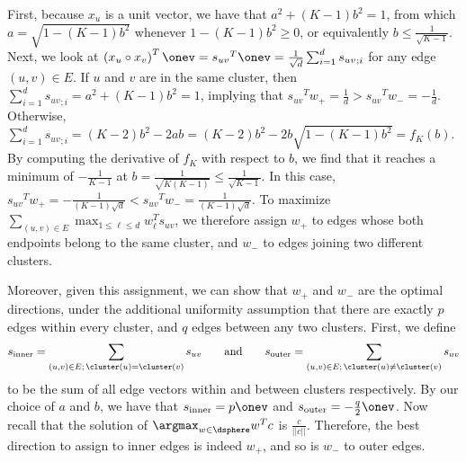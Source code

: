 First, because $x_u$ is a unit vector, we have that $a^2 + (K-1)b^2=1$, from which $a =
\sqrt{1-(K-1)b^2}$ whenever $1-(K-1)b^2 \geq 0$, or equivalently $b \leq \frac{1}{\sqrt{K-1}}$.
Next, we look at $\left(x_u \circ x_v\right)^T \onev = {s_{uv}}^T \onev = \frac{1}{\sqrt{d}}
\sum_{i=1}^d  {s_{uv}}_{;i}$ for any edge $(u,v) \in E$. If $u$ and $v$ are in the same cluster, then
$\sum_{i=1}^d  {s_{uv}}_{;i} = a^2 + (K-1)b^2 = 1$, implying that ${s_{uv}}^T w_+ = \frac{1}{d} >
{s_{uv}}^T w_- = -\frac{1}{d}$. Otherwise, $\sum_{i=1}^d  {s_{uv}}_{;i} = (K-2)b^2 - 2ab = (K-2)b^2 -
2b\sqrt{1-(K-1)b^2} = f_K(b)$. By computing the derivative of $f_K$ with respect to $b$, we find
that it reaches a minimum of $-\frac{1}{K-1}$ at $b = \frac{1}{\sqrt{K(K-1)}} \leq
\frac{1}{\sqrt{K-1}}$. In this case, ${s_{uv}}^T w_+ = -\frac{1}{(K-1) \sqrt{d}} < {s_{uv}}^T w_- =
\frac{1}{(K-1) \sqrt{d}}$. To maximize $\sum_{(u,v)\in E} \max_{1 \leq \ell \leq d} w_\ell^T
s_{uv}$, we therefore assign $w_+$ to edges whose both endpoints belong to the same cluster, and
$w_-$ to edges joining two different clusters.

Moreover, given this assignment, we can show that $w_+$ and $w_-$ are the optimal directions, under
the additional uniformity assumption that there are exactly $p$ edges within every cluster, and $q$
edges between any two clusters. First, we define
\begin{equation*}
  s_{\mathrm{inner}} = \sum_{(u,v) \in E;\, \cluster(u)=\cluster(v)} s_{uv} \qquad \text{and} \qquad
  s_{\mathrm{outer}} = \sum_{(u,v) \in E;\, \cluster(u)\neq \cluster(v)} s_{uv}
\end{equation*}
to be the sum of all edge vectors within and between clusters respectively. By our choice of $a$ and
$b$, we have that $s_{\mathrm{inner}} = p\onev$ and $s_{\mathrm{outer}} = -\frac{q}{2}\onev$. Now
recall that the solution of $\argmax_{w\in \dsphere} w^T c$ is $\frac{c}{||c||}$. Therefore, the
best direction to assign to inner edges is indeed $w_+$, and so is $w_-$ to outer edges.

